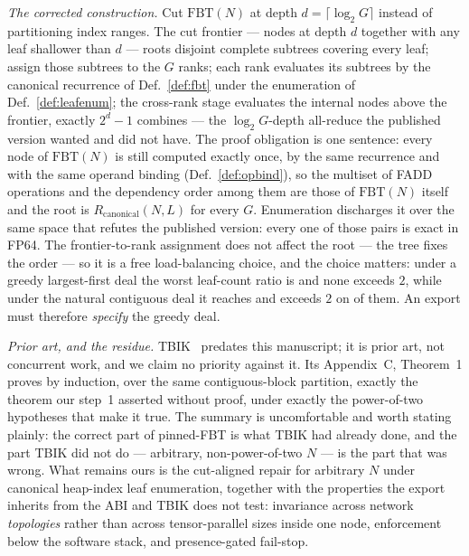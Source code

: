 \documentclass[journal,10pt]{IEEEtran}
\theoremstyle{plain}
\theoremstyle{definition}
\theoremstyle{remark}
\newcommand{\FBT}{\ensuremath{\mathrm{FBT}}}
\newcommand{\Rcan}{\ensuremath{R_{\mathrm{canonical}}}}
\begin{document}
\emph{The corrected construction.} Cut $\FBT(N)$ at depth
$d = \lceil \log_2 G \rceil$ instead of partitioning index ranges. The cut
frontier --- nodes at depth $d$ together with any leaf shallower than $d$ ---
roots disjoint complete subtrees covering every leaf; assign those subtrees to
the $G$ ranks; each rank evaluates its subtrees by the canonical recurrence of
Def.~\ref{def:fbt} under the enumeration of Def.~\ref{def:leafenum}; the
cross-rank stage evaluates the internal nodes above the frontier, exactly
$2^{d}-1$ combines --- the $\log_2 G$-depth all-reduce the published version
wanted and did not have. The proof obligation is one sentence: every node of
$\FBT(N)$ is still computed exactly once, by the same recurrence and with the
same operand binding (Def.~\ref{def:opbind}), so the multiset of FADD
operations and the dependency order among them are those of $\FBT(N)$ itself
and the root is $\Rcan(N,L)$ for every $G$. Enumeration discharges it over the
same space that refutes the published version: every one of those
\SweepPairs{} pairs is exact in FP64. The frontier-to-rank assignment does not
affect the root --- the tree fixes the order --- so it is a free
load-balancing choice, and the choice matters: under a greedy largest-first
deal the worst leaf-count ratio is \PinImbLpt{} and none exceeds $2$, while
under the natural contiguous deal it reaches \PinImbContig{} and exceeds $2$
on \PinImbContigOver{} of them. An export must therefore \emph{specify} the
greedy deal.

\emph{Prior art, and the residue.} TBIK~\cite{tbik2025} predates this
manuscript; it is prior art, not concurrent work, and we claim no priority
against it. Its Appendix~C, Theorem~1 proves by induction, over the same
contiguous-block partition, exactly the theorem our step~1 asserted without
proof, under exactly the power-of-two hypotheses that make it true. The
summary is uncomfortable and worth stating plainly: the correct part of
pinned-FBT is what TBIK had already done, and the part TBIK did not do ---
arbitrary, non-power-of-two $N$ --- is the part that was wrong. What remains
ours is the cut-aligned repair for arbitrary $N$ under canonical heap-index
leaf enumeration, together with the properties the export inherits from the
ABI and TBIK does not test: invariance across network \emph{topologies} rather
than across tensor-parallel sizes inside one node, enforcement below the
software stack, and presence-gated fail-stop.
\end{document}
